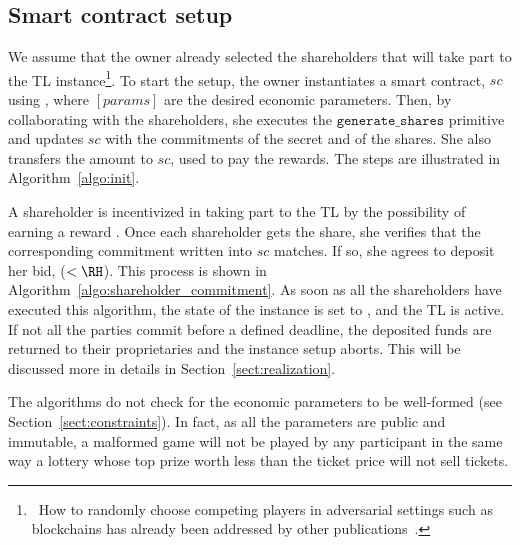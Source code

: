 \subsection{Smart contract setup}\label{sect:sc_init}

We assume that the owner already selected the shareholders that will take part to the TL instance\footnote{\ How to randomly choose competing players in adversarial settings such as blockchains has already been addressed by other publications~\cite{dong2017betrayal,10.1007/978-3-030-01177-2_81}.}.
To start the setup, the owner instantiates a smart contract, $sc$ using \priminit{[params]}, where $[params]$ are the desired economic parameters.
Then, by collaborating with the shareholders, she executes the $\texttt{generate\_shares}$ primitive and updates $sc$ with the commitments of the secret and of the shares.
She also transfers the amount \PO to $sc$, used to pay the rewards.
The steps are illustrated in Algorithm~\ref{algo:init}.

A shareholder \shareholder is incentivized in taking part to the TL by the possibility of earning a reward \RH.
Once each shareholder gets the share, she verifies that the corresponding commitment written into $sc$ matches. 
If so, she agrees to deposit her bid, \BH ($<\RH$). 
This process is shown in Algorithm~\ref{algo:shareholder_commitment}.
%
As soon as all the shareholders have executed this algorithm, the state of the instance is set to \statelocked, and the TL is active. 
If not all the parties commit before a defined deadline, the deposited funds are returned to their proprietaries and the instance setup aborts. This will be discussed more in details in Section~\ref{sect:realization}.

The algorithms do not check for the economic parameters to be well-formed (see Section~\ref{sect:constraints}). 
In fact, as all the parameters are public and immutable, a malformed game will not be played by any participant in the same way a lottery whose top prize worth less than the ticket price will not sell tickets.


